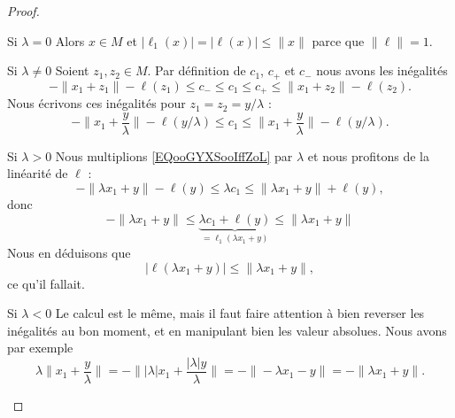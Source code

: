 \begin{proof}
\begin{subproof}
            \begin{subproof}
            \item[Si \( \lambda=0\)]
                Alors \( x\in M\) et \( |\ell_1(x)|=|\ell(x)|\leq \| x \|\) parce que \( \| \ell \|=1\).
            \item[Si \( \lambda\neq 0\)]
                Soient \( z_1,z_2\in M\). Par définition de \( c_1\), \( c_+\) et \( c_-\) nous avons les inégalités
                \begin{equation}
                    -\| x_1+z_1 \|-\ell(z_1)\leq c_-\leq c_1\leq c_+\leq \| x_1+z_2 \|-\ell(z_2).
                \end{equation}
                Nous écrivons ces inégalités pour \( z_1=z_2=y/\lambda\) :
                \begin{equation}        \label{EQooGYXSooIffZoL}
                    -\| x_1+\frac{ y }{ \lambda } \|-\ell(y/\lambda)\leq c_1\leq \| x_1+\frac{ y }{ \lambda } \|-\ell(y/\lambda).
                \end{equation}
            \item[Si \( \lambda>0\)]
                Nous multiplions \eqref{EQooGYXSooIffZoL} par \( \lambda\) et nous profitons de la linéarité de \( \ell\) :
                \begin{equation}
                    -\| \lambda x_1+y \|-\ell(y)\leq \lambda c_1\leq \| \lambda x_1+y \|+\ell(y),
                \end{equation}
                donc
                \begin{equation}        \label{EQooYRULooBebNTq}
                    -\| \lambda x_1+y \|\leq \underbrace{\lambda c_1+\ell(y)}_{=\ell_1(\lambda x_1+y)}\leq \| \lambda x_1+y \|
                \end{equation}
                Nous en déduisons que
                \begin{equation}
                    | \ell(\lambda x_1+y) |\leq \| \lambda x_1+y \|,
                \end{equation}
                ce qu'il fallait.
            \item[Si \( \lambda<0\)]
                Le calcul est le même, mais il faut faire attention à bien reverser les inégalités au bon moment, et en manipulant bien les valeur absolues. Nous avons par exemple
                \begin{equation}
                    \lambda\|  x_1+\frac{ y }{ \lambda } \|=-\big\| | \lambda |x_1+\frac{ | \lambda |y }{ \lambda } \big\|=-\| -\lambda x_1-y \|=-\| \lambda x_1+y \|.

\end{equation}
\end{subproof}
\end{subproof}
\end{proof}
